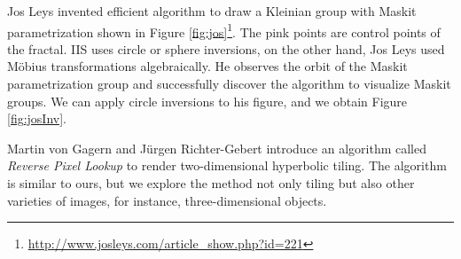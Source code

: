 Jos Leys invented efficient algorithm to draw a Kleinian group with Maskit
parametrization shown in Figure
\ref{fig:jos}\footnote{\url{http://www.josleys.com/article_show.php?id=221}}. 
The pink points are control points of the fractal.
IIS uses circle or sphere inversions, on the other hand, Jos Leys used
M\"obius transformations algebraically.
He observes the orbit of the Maskit parametrization group and
successfully discover the algorithm to visualize Maskit groups.
We can apply circle inversions to his figure, and we obtain Figure \ref{fig:josInv}.

Martin von Gagern and J\"urgen Richter-Gebert introduce an algorithm
called \textit{Reverse Pixel Lookup}
\cite{journals/combinatorics/GagernR09} to render two-dimensional
hyperbolic tiling.
The algorithm is similar to ours, but
we explore the method not only tiling but also other varieties of
images, for instance, three-dimensional objects.
